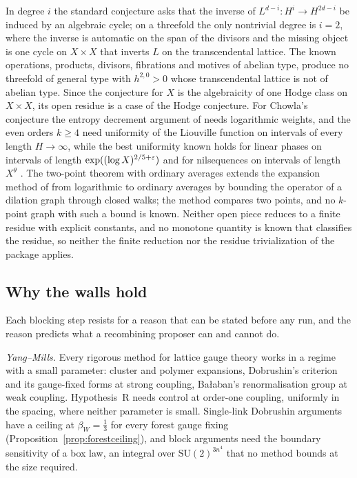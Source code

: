 In degree $i$ the standard conjecture asks that the inverse of $L^{d-i}\colon H^{i}\to H^{2d-i}$ be induced by an algebraic cycle; on a threefold the only nontrivial degree is $i=2$, where the inverse is automatic on the span of the divisors and the missing object is one cycle on $X\times X$ that inverts $L$ on the transcendental lattice. The known operations, products, divisors, fibrations and motives of abelian type, produce no threefold of general type with $h^{2,0}>0$ whose transcendental lattice is not of abelian type. Since the conjecture for $X$ is the algebraicity of one Hodge class on $X\times X$, its open residue is a case of the Hodge conjecture. For Chowla's conjecture the entropy decrement argument of \cite{Tao16} needs logarithmic weights, and the even orders $k\ge4$ need uniformity of the Liouville function on intervals of every length $H\to\infty$, while the best uniformity known holds for linear phases on intervals of length $\exp((\log X)^{2/5+\varepsilon})$ \cite{Pil26} and for nilsequences on intervals of length $X^{\theta}$ \cite{MRT23}. The two-point theorem with ordinary averages \cite{OAI26c} extends the expansion method of \cite{HR21} from logarithmic to ordinary averages by bounding the operator of a dilation graph through closed walks; the method compares two points, and no $k$-point graph with such a bound is known. Neither open piece reduces to a finite residue with explicit constants, and no monotone quantity is known that classifies the residue, so neither the finite reduction nor the residue trivialization of the package applies.


\subsection{Why the walls hold}\label{ssec:whyhard}

Each blocking step resists for a reason that can be stated before any run, and the reason predicts what a recombining proposer can and cannot do.

\emph{Yang--Mills.} Every rigorous method for lattice gauge theory works in a regime with a small parameter: cluster and polymer expansions, Dobrushin's criterion and its gauge-fixed forms at strong coupling, Ba{\l}aban's renormalisation group at weak coupling. Hypothesis~R needs control at order-one coupling, uniformly in the spacing, where neither parameter is small. Single-link Dobrushin arguments have a ceiling at $\beta_{W}=\frac13$ for every forest gauge fixing (Proposition~\ref{prop:forestceiling}), and block arguments need the boundary sensitivity of a box law, an integral over $\mathrm{SU}(2)^{3n^{4}}$ that no method bounds at the size required.

